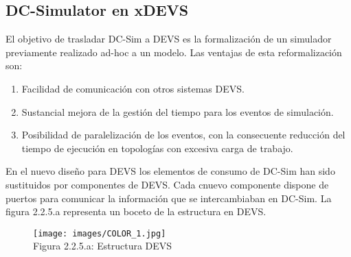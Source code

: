 \subsection{DC-Simulator en xDEVS}
El objetivo de trasladar DC-Sim a DEVS es la formalización de un simulador previamente realizado ad-hoc a un modelo. Las ventajas de esta reformalización son:
\begin{enumerate}
\item Facilidad de comunicación con otros sistemas DEVS.
\item Sustancial mejora de la gestión del tiempo para los eventos de simulación.
\item Posibilidad de paralelización de los eventos, con la consecuente reducción del tiempo de ejecución en topologías con excesiva carga de trabajo.
\end{enumerate}
En el nuevo diseño para DEVS los elementos de consumo de DC-Sim han sido sustituidos por componentes de DEVS. Cada cnuevo componente dispone de puertos para comunicar la información que se intercambiaban en DC-Sim. La figura 2.2.5.a representa un boceto de la estructura en DEVS.%

\begin{figure}[H]
\begin{center}
\texttt{[image: images/COLOR\_1.jpg]}
\\[0.5cm]
Figura 2.2.5.a: Estructura DEVS
\end{center}
\end{figure}